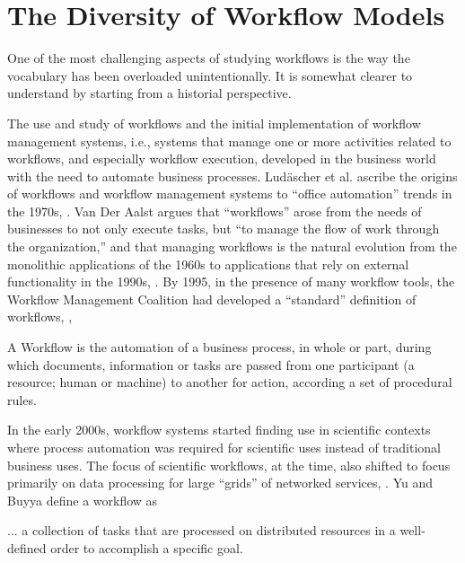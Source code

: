 \section{The Diversity of Workflow Models}\label{workflows}

One of the most challenging aspects of studying
workflows is the way the vocabulary has been overloaded unintentionally.
It is somewhat clearer to understand by starting from a historial
perspective.

The use and study of workflows and the initial implementation of workflow
management systems, i.e., systems that manage one or more activities related
to workflows, and especially workflow execution, developed in the business
world with the need to automate business processes. Lud\"{a}scher et al.
ascribe the origins of workflows and workflow management systems to ``office
automation'' trends in the 1970s, \cite{ludascher_scientific_2006}. Van Der
Aalst argues that ``workflows'' arose from the needs of businesses to not only
execute tasks, but ``to manage the flow of work through the organization,''
and that managing workflows is the natural evolution from the monolithic
applications of the 1960s to applications that rely on external functionality
in the 1990s, \cite{van_der_aalst_application_1998}. By 1995, in the presence
of many workflow tools, the Workflow Management Coalition had developed a
``standard'' definition of workflows, \cite{hollingsworth_workflow_1993},

\begin{displayquote}
A Workflow is the automation of a business process, in whole or part, during
which documents, information or tasks are passed from one participant (a 
resource; human or machine) to another for action, according a set of 
procedural rules. 
\end{displayquote}

In the early 2000s, workflow systems started finding use in scientific
contexts where process automation was required for scientific uses
instead of traditional business uses. The focus of scientific workflows,
at the time, also shifted to focus primarily on data processing for
large ``grids'' of networked services, \cite{yu_taxonomy_2005}. Yu and Buyya
define a workflow as

\begin{displayquote}
... a collection of tasks that are processed on distributed resources in a
well-defined order to accomplish a specific goal.
\end{displayquote}

